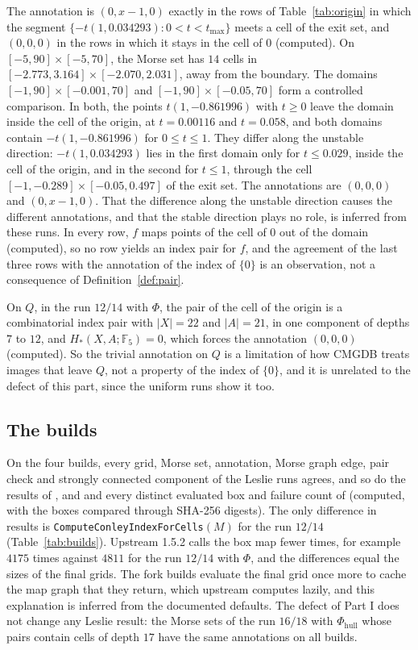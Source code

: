 \documentclass[11pt]{article}
\theoremstyle{plain}
\theoremstyle{definition}
\theoremstyle{remark}
\newcommand{\F}{\mathbb{F}_5}
\newcommand{\Phihull}{\Phi_{\mathrm{hull}}}
\newcommand{\code}[1]{\texttt{#1}}
\begin{document}
The annotation is $(0,x-1,0)$ exactly in the rows of Table~\ref{tab:origin} in which the segment $\{-t(1,0.034293):0<t<t_{\max}\}$ meets a cell of the exit set, and $(0,0,0)$ in the rows in which it stays in the cell of $0$ (computed). On $[-5,90]\times[-5,70]$, the Morse set has $14$ cells in $[-2.773,3.164]\times[-2.070,2.031]$, away from the boundary. The domains $[-1,90]\times[-0.001,70]$ and $[-1,90]\times[-0.05,70]$ form a controlled comparison. In both, the points $t(1,-0.861996)$ with $t\geq0$ leave the domain inside the cell of the origin, at $t=0.00116$ and $t=0.058$, and both domains contain $-t(1,-0.861996)$ for $0\leq t\leq1$. They differ along the unstable direction: $-t(1,0.034293)$ lies in the first domain only for $t\leq0.029$, inside the cell of the origin, and in the second for $t\leq1$, through the cell $[-1,-0.289]\times[-0.05,0.497]$ of the exit set. The annotations are $(0,0,0)$ and $(0,x-1,0)$. That the difference along the unstable direction causes the different annotations, and that the stable direction plays no role, is inferred from these runs. In every row, $f$ maps points of the cell of $0$ out of the domain (computed), so no row yields an index pair for $f$, and the agreement of the last three rows with the annotation of the index of $\{0\}$ is an observation, not a consequence of Definition~\ref{def:pair}.

On $Q$, in the run $12/14$ with $\Phi$, the pair of the cell of the origin is a combinatorial index pair with $|X|=22$ and $|A|=21$, in one component of depths $7$ to $12$, and $H_*(X,A;\F)=0$, which forces the annotation $(0,0,0)$ (computed). So the trivial annotation on $Q$ is a limitation of how CMGDB treats images that leave $Q$, not a property of the index of $\{0\}$, and it is unrelated to the defect of this part, since the uniform runs show it too.

\subsection{The builds}\label{sec:lesliebuilds}

On the four builds, every grid, Morse set, annotation, Morse graph edge, pair check and strongly connected component of the Leslie runs agrees, and so do the results of ,  and  and every distinct evaluated box and failure count of  (computed, with the boxes compared through SHA-256 digests). The only difference in results is \code{ComputeConleyIndexForCells}$(M)$ for the run $12/14$ (Table~\ref{tab:builds}). Upstream 1.5.2 calls the box map fewer times, for example $4175$ times against $4811$ for the run $12/14$ with $\Phi$, and the differences equal the sizes of the final grids. The fork builds evaluate the final grid once more to cache the map graph that they return, which upstream computes lazily, and this explanation is inferred from the documented defaults. The defect of Part I does not change any Leslie result: the Morse sets of the run $16/18$ with $\Phihull$ whose pairs contain cells of depth $17$ have the same annotations on all builds.
\end{document}

